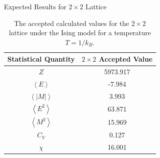 \documentclass{beamer} %
\begin{document}
\begin{frame}{Expected Results for $2\times2$ Lattice}
\begin{table}[ht]
\begin{center}
\begin{tabular}{c|c} \hline
Statistical Quantity & $2\times2$ Accepted Value \\ \hline
$Z$ & 5973.917 \\
$\left<E\right>$ &  -7.984 \\
$\left<\left|M\right|\right>$ & 3.993 \\
$\left<E^{2}\right>$ & 63.871 \\
$\left<M^{2}\right>$ & 15.969 \\
$C_{V}$ & 0.127 \\
$\chi$ & 16.001
\end{tabular}
\caption{The accepted calculated values for the $2\times2$ lattice under the Ising model for a temperature $T=1/k_{B}$.}
\label{tab:2x2exp}
\end{center}
\end{table}
\end{frame}
\end{document}
